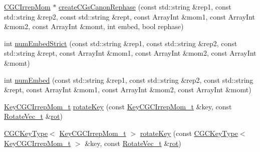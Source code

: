 \begin{DoxyCompactItemize}
\item 
\mbox{\hyperlink{classHadron_1_1CGCIrrepMom}{C\+G\+C\+Irrep\+Mom}} $\ast$ \mbox{\hyperlink{namespaceHadron_1_1CGC_a47b736ab1ac22edb39f4b0df589a7053}{create\+C\+Gs\+Canon\+Rephase}} (const std\+::string \&rep1, const std\+::string \&rep2, const std\+::string \&rept, const Array\+Int \&mom1, const Array\+Int \&mom2, const Array\+Int \&momt, int embed, bool rephase)
\item 
int \mbox{\hyperlink{namespaceHadron_1_1CGC_af5aac6c0d70eb7159aa635525bac7629}{num\+Embed\+Strict}} (const std\+::string \&rep1, const std\+::string \&rep2, const std\+::string \&rept, const Array\+Int \&mom1, const Array\+Int \&mom2, const Array\+Int \&momt)
\item 
int \mbox{\hyperlink{namespaceHadron_1_1CGC_af727ac6be27b471bc40b4696c2a29cdb}{num\+Embed}} (const std\+::string \&rep1, const std\+::string \&rep2, const std\+::string \&rept, const Array\+Int \&mom1, const Array\+Int \&mom2, const Array\+Int \&momt)
\item 
\mbox{\hyperlink{structHadron_1_1KeyCGCIrrepMom__t}{Key\+C\+G\+C\+Irrep\+Mom\+\_\+t}} \mbox{\hyperlink{namespaceHadron_1_1CGC_acdc26e4dd88e281dc6675da8d6d1b13d}{rotate\+Key}} (const \mbox{\hyperlink{structHadron_1_1KeyCGCIrrepMom__t}{Key\+C\+G\+C\+Irrep\+Mom\+\_\+t}} \&key, const \mbox{\hyperlink{structHadron_1_1RotateVec__t}{Rotate\+Vec\+\_\+t}} \&\mbox{\hyperlink{devel_2src_2rot__mat_8cc_a1db2ab3d82c6029ee441423308802a74}{rot}})
\item 
\mbox{\hyperlink{structHadron_1_1CGCKeyType}{C\+G\+C\+Key\+Type}}$<$ \mbox{\hyperlink{structHadron_1_1KeyCGCIrrepMom__t}{Key\+C\+G\+C\+Irrep\+Mom\+\_\+t}} $>$ \mbox{\hyperlink{namespaceHadron_1_1CGC_ad5f1f6f8b8dd82238f3efeb03d1dc6e5}{rotate\+Key}} (const \mbox{\hyperlink{structHadron_1_1CGCKeyType}{C\+G\+C\+Key\+Type}}$<$ \mbox{\hyperlink{structHadron_1_1KeyCGCIrrepMom__t}{Key\+C\+G\+C\+Irrep\+Mom\+\_\+t}} $>$ \&key, const \mbox{\hyperlink{structHadron_1_1RotateVec__t}{Rotate\+Vec\+\_\+t}} \&\mbox{\hyperlink{devel_2src_2rot__mat_8cc_a1db2ab3d82c6029ee441423308802a74}{rot}})
\end{DoxyCompactItemize}
